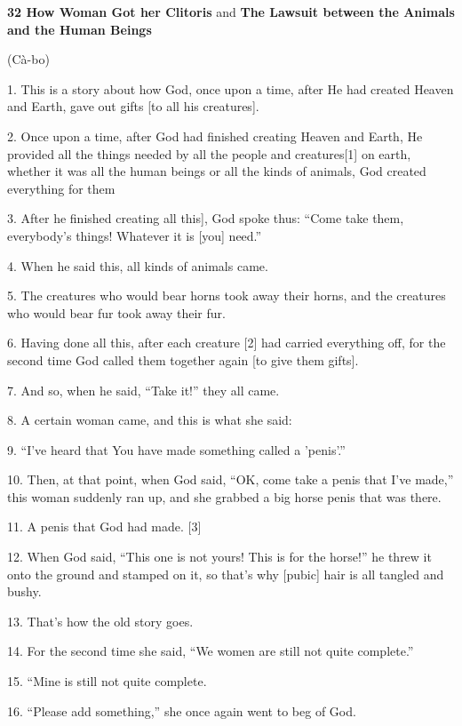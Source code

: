 
{\LARGE{}\textbf{32 How Woman Got her Clitoris}}{\LARGE{} and }{\LARGE{}\textbf{The
Lawsuit between the Animals and the Human Beings}}

{\LARGE{}(Cà-bo)}

{\LARGE{}1. This is a story about how God, once upon a time, after He had created
Heaven and Earth, gave out gifts [to all his creatures].}

{\LARGE{}2. Once upon a time, after God had finished creating Heaven and Earth,
He provided all the things needed by all the people and creatures[1] on earth,
whether it was all the human beings or all the kinds of animals, God created everything
for them}

{\LARGE{}3. After he finished creating all this], God spoke thus: ``Come take them,
everybody's things! Whatever it is [you] need.''}

{\LARGE{}4. When he said this, all kinds of animals came.}

{\LARGE{}5. The creatures who would bear horns took away their horns, and the creatures
who would bear fur took away their fur.}

{\LARGE{}6. Having done all this, after each creature [2] had carried everything
off, for the second time God called them together again [to give them gifts].}

{\LARGE{}7. And so, when he said, ``Take it!'' they all came.}

{\LARGE{}8. A certain woman came, and this is what she said:}

{\LARGE{}9. ``I've heard that You have made something called a 'penis'.''}

{\LARGE{}10. Then, at that point, when God said, ``OK, come take a penis that I've
made,'' this woman suddenly ran up, and she grabbed a big horse penis that was
there.}

{\LARGE{}11. A penis that God had made. [3]}

{\LARGE{}12. When God said, ``This one is not yours! This is for the horse!'' he
threw it onto the ground and stamped on it, so that's why [pubic] hair is all tangled
and bushy.}

{\LARGE{}13. That's how the old story goes.}

{\LARGE{}14. For the second time she said, ``We women are still not quite complete.''}

{\LARGE{}15. ``Mine is still not quite complete.}

{\LARGE{}16. ``Please add something,'' she once again went to beg of God.}


